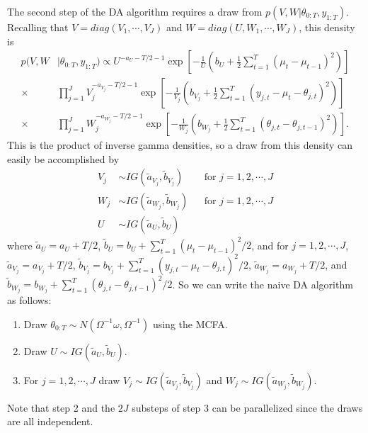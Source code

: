 \documentclass[graybox]{svmult}
\begin{document}
The second step of the DA algorithm requires a draw from $p(V,W|\theta_{0:T},y_{1:T})$. Recalling that $V=diag(V_1,\cdots,V_J)$ and $W=diag(U,W_1,\cdots,W_J)$, this density is
\begin{align*}
p(V,W&|\theta_{0:T},y_{1:T}) \propto U^{-a_{U}-T/2-1}\exp\left[-\frac{1}{U}\left(b_U + \frac{1}{2}\sum_{t=1}^T(\mu_t - \mu_{t-1})^2\right)\right]\\
\times&\prod_{j=1}^J V_j^{-a_{V_j} - T/2 - 1}\exp\left[-\frac{1}{V_j}\left(b_{V_j} + \frac{1}{2}\sum_{t=1}^T(y_{j,t} - \mu_t - \theta_{j,t})^2\right)\right] \\
\times& \prod_{j=1}^JW_j^{-a_{W_j} - T/2 - 1}\exp\left[-\frac{1}{W_j}\left(b_{W_j} + \frac{1}{2}\sum_{t=1}^T(\theta_{j,t} - \theta_{j,t-1})^2\right)\right].
\end{align*}
This is the product of inverse gamma densities, so a draw from this density can easily be accomplished by
\begin{align*}
V_j &\sim IG(\tilde{a}_{V_j},\tilde{b}_{V_j}) &&\mbox{for } j=1,2,\cdots,J\\
W_j &\sim IG(\tilde{a}_{W_j},\tilde{b}_{W_j}) &&\mbox{for } j=1,2,\cdots,J\\
U &\sim IG(\tilde{a}_{U},\tilde{b}_U) &&
\end{align*}
where $\tilde{a}_U = a_U + T/2$, $\tilde{b}_U = b_U + \sum_{t=1}^T(\mu_t - \mu_{t-1})^2/2$, and for $j=1,2,\cdots,J$, $\tilde{a}_{V_j} = a_{V_j} + T/2$, $\tilde{b}_{V_j} = b_{V_j} + \sum_{t=1}^T(y_{j,t} - \mu_t - \theta_{j,t})^2/2$, $\tilde{a}_{W_j}=a_{W_j} + T/2$, and $\tilde{b}_{W_j} = b_{W_j} + \sum_{t=1}^T(\theta_{j,t} - \theta_{j,t-1})^2/2$. So we can write the naive DA algorithm as follows:
\begin{enumerate}
\item Draw $\theta_{0:T}\sim N(\Omega^{-1}\omega, \Omega^{-1})$ using the MCFA.
\item Draw $U\sim IG(\tilde{a}_U,\tilde{b}_U)$. 
\item For $j=1,2,\cdots,J$ draw $V_j\sim IG(\tilde{a}_{V_j},\tilde{b}_{V_j})$ and $W_j\sim IG(\tilde{a}_{W_j},\tilde{b}_{W_j})$.
\end{enumerate}
Note that step 2 and the $2J$ substeps of step 3 can be parallelized since the draws are all independent.
\end{document}
